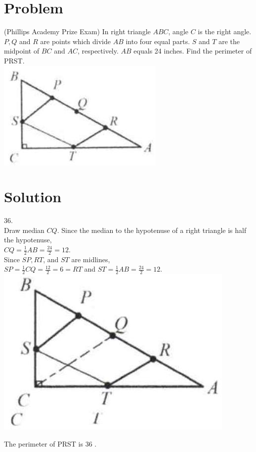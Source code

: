 \documentclass{article}
\begin{document}
\section*{Problem}
(Phillips Academy Prize Exam) In right triangle \(A B C\), angle \(C\) is the right angle. \(P, Q\) and \(R\) are points which divide \(A B\) into four equal parts. \(S\) and \(T\) are the midpoint of \(B C\) and \(A C\), respectively. \(A B\) equals 24 inches. Find the perimeter of PRST.\\
\centering
\includegraphics[width=\textwidth]{images/044(3).jpg}

\section*{Solution}
36.\\
Draw median \(C Q\). Since the median to the hypotenuse of a right triangle is half the hypotenuse,\\
\(C Q=\frac{1}{2} A B=\frac{24}{2}=12\).\\
Since \(S P, R T\), and \(S T\) are midlines,\\
\(S P=\frac{1}{2} C Q=\frac{12}{2}=6=R T\) and \(S T=\frac{1}{2} A B=\frac{24}{2}=12\).\\
\centering
\includegraphics[width=\textwidth]{images/047(2).jpg}

The perimeter of PRST is 36 .
\end{document}
